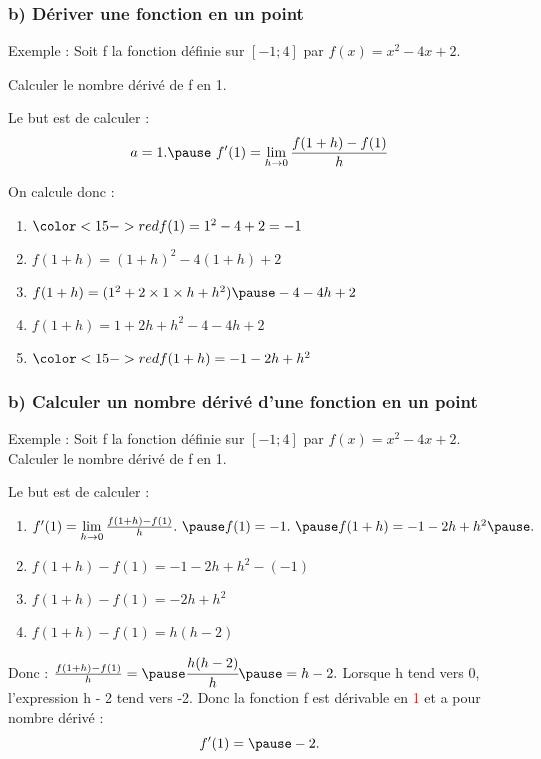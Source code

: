 \documentclass[t]{beamer}
\begin{document}
\begin{frame}[label=pagebanale]
\frametitle{b) Dériver une fonction en un point}
\pause
\begin{exampleblock}{Exemple :}
\pause
Soit f la fonction définie sur
\( \left[ - 1 ; 4 \right]\)
par
\( f(x) = x^2 - 4x + 2\).


\pause
Calculer le nombre dérivé de f en 1.
\pause
\end{exampleblock}
\begin{block}{Le but est de calculer :}
\pause
\[  a = 1. \pause \
f'(1) =\lim\limits_{h \rightarrow 0}\frac{f(1+h) - f(1)}{h}\]
\pause
\end{block}
\begin{block}{On calcule donc :}
\pause
\begin{enumerate}[]
\item<+-> $\color<15->{red}{f(1) = 1^2 - 4 + 2 = -1}$
\item<+-> $f(1+ h) = (1+h)^2 - 4(1+h) + 2$
\item<+-> $f(1+ h) = (1^2 + 2 \times 1 \times h + h^2) \pause - 4 - 4h + 2$
\item<+-> $f(1+ h) = 1 + 2h + h^2  - 4 - 4h + 2$
\item<+-> $\color<15->{red}{f(1+ h) = -1 - 2h + h^2} $
\end{enumerate}
\end{block}
\end{frame}

\begin{frame}[label=pagebanale]
\frametitle{b) Calculer un nombre dérivé d'une fonction en un point}
\pause
\begin{exampleblock}{Exemple :}
\pause
Soit f la fonction définie sur
\( \left[ - 1 ; 4 \right]\)
par
\( f(x) = x^2 - 4x + 2\).
\pause
Calculer le nombre dérivé de f en 1.
\pause
\end{exampleblock}
\begin{block}{Le but est de calculer :}
\pause
\begin{enumerate}[]
\item<+-> \textcolor{green}{\(f'(1) = \lim\limits_{h \rightarrow 0}\frac{f(1+h) - f(1)}{h}.\ \pause f(1) = -1. \ \pause f(1+ h) = -1 - 2h + h^2 \pause.\)}
\item<+-> $f(1+ h) - f(1)  = -1 - 2h + h^2 - (-1) $
\item<+-> $f(1+ h) - f(1)  = -2h + h^2 $
\item<+-> $f(1+ h) - f(1)  = h(h - 2) $
\end{enumerate}
\pause
Donc : 
\( \frac{f(1+ h) - f(1)}{h} = \pause \cfrac{ h(h-2)}{h} \pause = h - 2.\) 
\pause
Lorsque h tend vers 0, \pause l'expression h - 2 tend vers -2. \pause
Donc la fonction f est dérivable en \textcolor{red}{1} \pause et a pour nombre dérivé : \pause
\textcolor{red}{\[f'(1) = \pause -2.\]}
\end{block}
\end{frame}
\end{document}
